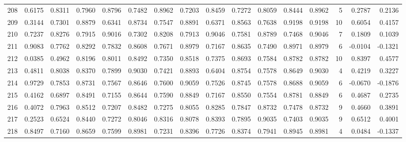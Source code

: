 \begin{tabular}{lrrrrrrrrrrrrrrr}
208 &      0.6175 &  0.8311 &  0.7960 &  0.8796 &  0.7482 &  0.8962 &  0.7203 &  0.8459 &  0.7272 &  0.8059 &   0.8444 &     0.8962 &      5 &                    0.2787 &                     0.2136 \\
209 &      0.3144 &  0.7301 &  0.8879 &  0.6341 &  0.8734 &  0.7547 &  0.8891 &  0.6371 &  0.8563 &  0.7638 &   0.9198 &     0.9198 &     10 &                    0.6054 &                     0.4157 \\
210 &      0.7237 &  0.8276 &  0.7915 &  0.9016 &  0.7302 &  0.8208 &  0.7913 &  0.9046 &  0.7581 &  0.8789 &   0.7468 &     0.9046 &      7 &                    0.1809 &                     0.1039 \\
211 &      0.9083 &  0.7762 &  0.8292 &  0.7832 &  0.8608 &  0.7671 &  0.8979 &  0.7167 &  0.8635 &  0.7490 &   0.8971 &     0.8979 &      6 &                   -0.0104 &                    -0.1321 \\
212 &      0.0385 &  0.4962 &  0.8196 &  0.8011 &  0.8492 &  0.7350 &  0.8518 &  0.7375 &  0.8693 &  0.7584 &   0.8782 &     0.8782 &     10 &                    0.8397 &                     0.4577 \\
213 &      0.4811 &  0.8038 &  0.8370 &  0.7899 &  0.9030 &  0.7421 &  0.8893 &  0.6404 &  0.8754 &  0.7578 &   0.8649 &     0.9030 &      4 &                    0.4219 &                     0.3227 \\
214 &      0.9729 &  0.7853 &  0.8731 &  0.7567 &  0.8646 &  0.7600 &  0.9059 &  0.7526 &  0.8745 &  0.7578 &   0.8688 &     0.9059 &      6 &                   -0.0670 &                    -0.1876 \\
215 &      0.4162 &  0.6897 &  0.8491 &  0.7155 &  0.8644 &  0.7590 &  0.8849 &  0.7167 &  0.8550 &  0.7554 &   0.8781 &     0.8849 &      6 &                    0.4687 &                     0.2735 \\
216 &      0.4072 &  0.7963 &  0.8512 &  0.7207 &  0.8482 &  0.7275 &  0.8055 &  0.8285 &  0.7847 &  0.8732 &   0.7478 &     0.8732 &      9 &                    0.4660 &                     0.3891 \\
217 &      0.2523 &  0.6524 &  0.8440 &  0.7272 &  0.8046 &  0.8316 &  0.8078 &  0.8393 &  0.7895 &  0.9035 &   0.7403 &     0.9035 &      9 &                    0.6512 &                     0.4001 \\
218 &      0.8497 &  0.7160 &  0.8659 &  0.7599 &  0.8981 &  0.7231 &  0.8396 &  0.7726 &  0.8374 &  0.7941 &   0.8945 &     0.8981 &      4 &                    0.0484 &                    -0.1337 \\

\end{tabular}
